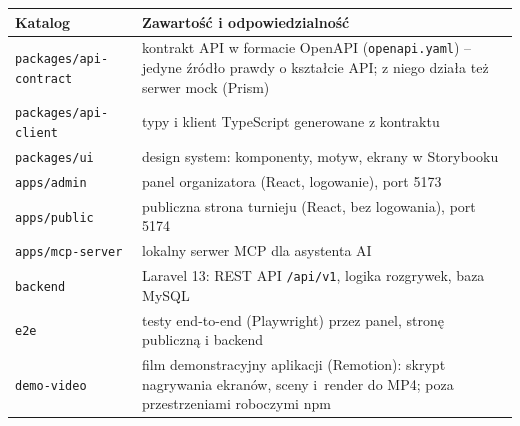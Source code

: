 \documentclass[11pt,a4paper,oneside]{article}
\begin{document}
\begin{tabularx}{\textwidth}{@{}p{} Y@{}}
\toprule
Katalog & Zawartość i odpowiedzialność\\
\midrule
\texttt{packages/api-contract} & kontrakt API w formacie OpenAPI (\texttt{openapi.yaml}) -- jedyne źródło prawdy o kształcie API; z niego działa też serwer mock (Prism)\\
\texttt{packages/api-client} & typy i klient TypeScript generowane z kontraktu\\
\texttt{packages/ui} & design system: komponenty, motyw, ekrany w Storybooku\\
\texttt{apps/admin} & panel organizatora (React, logowanie), port 5173\\
\texttt{apps/public} & publiczna strona turnieju (React, bez logowania), port 5174\\
\texttt{apps/mcp-server} & lokalny serwer MCP dla asystenta AI\\
\texttt{backend} & Laravel 13: REST API \texttt{/api/v1}, logika rozgrywek, baza MySQL\\
\texttt{e2e} & testy end-to-end (Playwright) przez panel, stronę publiczną i backend\\
\texttt{demo-video} & film demonstracyjny aplikacji (Remotion): skrypt nagrywania ekranów, sceny i~render do MP4; poza przestrzeniami roboczymi npm\\
\bottomrule
\end{tabularx}
\end{document}
